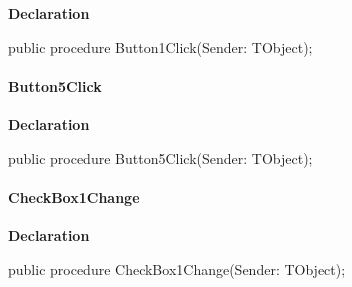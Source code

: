 \documentclass{report}
\newif\ifpdf
\begin{document}
\label{mainunit.TIWizFrm-Button1Click}
\begin{list}{}{
\setlength{\itemindent}{0cm}
\setlength{\listparindent}{0cm}
\setlength{\leftmargin}{\evensidemargin}
\addtolength{\leftmargin}{\tmplength}
\settowidth{\labelsep}{X}
\addtolength{\leftmargin}{\labelsep}
\setlength{\labelwidth}{\tmplength}
}
\item[\textbf{Declaration}\hfill]
\ifpdf
\begin{flushleft}
\fi
\begin{ttfamily}
public procedure Button1Click(Sender: TObject);\end{ttfamily}

\ifpdf
\end{flushleft}
\fi

\end{list}
\paragraph*{Button5Click}\hspace*{\fill}

\label{mainunit.TIWizFrm-Button5Click}
\begin{list}{}{
\setlength{\itemindent}{0cm}
\setlength{\listparindent}{0cm}
\setlength{\leftmargin}{\evensidemargin}
\addtolength{\leftmargin}{\tmplength}
\settowidth{\labelsep}{X}
\addtolength{\leftmargin}{\labelsep}
\setlength{\labelwidth}{\tmplength}
}
\item[\textbf{Declaration}\hfill]
\ifpdf
\begin{flushleft}
\fi
\begin{ttfamily}
public procedure Button5Click(Sender: TObject);\end{ttfamily}

\ifpdf
\end{flushleft}
\fi

\end{list}
\paragraph*{CheckBox1Change}\hspace*{\fill}

\label{mainunit.TIWizFrm-CheckBox1Change}
\begin{list}{}{
\setlength{\itemindent}{0cm}
\setlength{\listparindent}{0cm}
\setlength{\leftmargin}{\evensidemargin}
\addtolength{\leftmargin}{\tmplength}
\settowidth{\labelsep}{X}
\addtolength{\leftmargin}{\labelsep}
\setlength{\labelwidth}{\tmplength}
}
\item[\textbf{Declaration}\hfill]
\ifpdf
\begin{flushleft}
\fi
\begin{ttfamily}
public procedure CheckBox1Change(Sender: TObject);\end{ttfamily}

\ifpdf
\end{flushleft}
\fi

\end{list}
\end{document}
